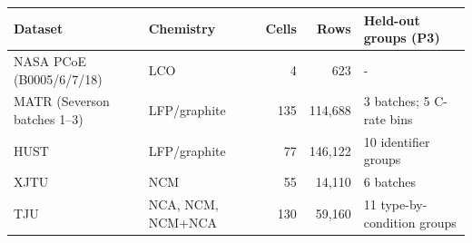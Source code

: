 \begin{tabular}{llrrl}
\toprule
Dataset & Chemistry & Cells & Rows & Held-out groups (P3) \\
\midrule
NASA PCoE (B0005/6/7/18) & LCO & 4 & 623 & - \\
MATR (Severson batches 1--3) & LFP/graphite & 135 & 114,688 & 3 batches; 5 C-rate bins \\
HUST & LFP/graphite & 77 & 146,122 & 10 identifier groups \\
XJTU & NCM & 55 & 14,110 & 6 batches \\
TJU & NCA, NCM, NCM+NCA & 130 & 59,160 & 11 type-by-condition groups \\
\bottomrule
\end{tabular}
